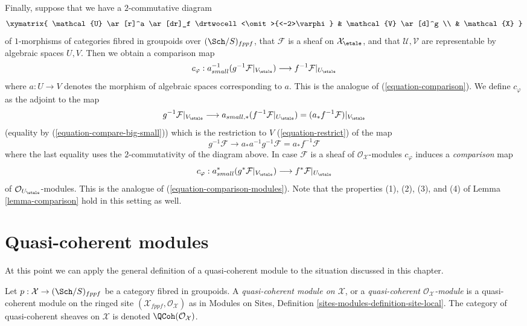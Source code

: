 \medskip\noindent
Finally, suppose that we have a $2$-commutative diagram
$$
\xymatrix{
\mathcal{U} \ar[r]^a \ar[dr]_f \drtwocell<\omit>{<-2>\varphi} &
\mathcal{V} \ar[d]^g \\
& \mathcal{X}
}
$$
of $1$-morphisms of categories fibred in groupoids over $(\Sch/S)_{fppf}$,
that $\mathcal{F}$ is a sheaf on $\mathcal{X}_\etale$,
and that $\mathcal{U}, \mathcal{V}$ are representable by algebraic
spaces $U, V$. Then we obtain a comparison map
\begin{equation}
\label{equation-comparison-algebraic-spaces}
c_\varphi : a_{small}^{-1}(g^{-1}\mathcal{F}|_{V_\etale})
\longrightarrow
f^{-1}\mathcal{F}|_{U_\etale}
\end{equation}
where $a : U \to V$ denotes the morphism of algebraic spaces corresponding
to $a$. This is the analogue of (\ref{equation-comparison}). We define
$c_\varphi$ as the adjoint to the map
$$
g^{-1}\mathcal{F}|_{V_\etale}
\longrightarrow
a_{small, *}(f^{-1}\mathcal{F}|_{U_\etale}) =
(a_*f^{-1}\mathcal{F})|_{V_\etale}
$$
(equality by (\ref{equation-compare-big-small}))
which is the restriction to $V$ (\ref{equation-restrict}) of the map
$$
g^{-1}\mathcal{F} \to a_*a^{-1}g^{-1}\mathcal{F} = a_*f^{-1}\mathcal{F}
$$
where the last equality uses the $2$-commutativity of the diagram above.
In case $\mathcal{F}$ is a sheaf of $\mathcal{O}_\mathcal{X}$-modules
$c_\varphi$ induces a {\it comparison} map
\begin{equation}
\label{equation-comparison-algebraic-spaces-modules}
c_\varphi : a_{small}^*(g^*\mathcal{F}|_{V_\etale})
\longrightarrow
f^*\mathcal{F}|_{U_\etale}
\end{equation}
of $\mathcal{O}_{U_\etale}$-modules. This is the analogue of
(\ref{equation-comparison-modules}).
Note that the properties (1), (2), (3), and (4) of
Lemma \ref{lemma-comparison}
hold in this setting as well.












\section{Quasi-coherent modules}
\label{section-quasi-coherent}

\noindent
At this point we can apply the general definition of a quasi-coherent
module to the situation discussed in this chapter.

\begin{definition}
\label{definition-quasi-coherent}
Let $p : \mathcal{X} \to (\Sch/S)_{fppf}$ be a category fibred
in groupoids. A {\it quasi-coherent module on $\mathcal{X}$}, or a
{\it quasi-coherent $\mathcal{O}_\mathcal{X}$-module} is a
quasi-coherent module on the ringed site
$(\mathcal{X}_{fppf}, \mathcal{O}_\mathcal{X})$ as in
Modules on Sites, Definition \ref{sites-modules-definition-site-local}.
The category of quasi-coherent sheaves on $\mathcal{X}$
is denoted $\QCoh(\mathcal{O}_\mathcal{X})$.
\end{definition}

